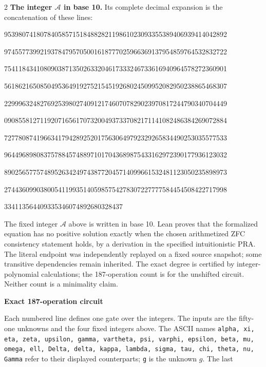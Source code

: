 \documentclass[10pt]{article}
\begin{document}
\begin{multicols}{2}
\textbf{The integer $\mathcal A$ in base 10.}
Its complete decimal expansion is the concatenation of these lines:\par
\begingroup\fontsize{7.7}{8.2}\selectfont{}\par
95398074180784058571518488282119861023093355389406939414042892\par
97455773992193784795705001618777025966369137954859764532832722\par
75411843410809038713502633204617333246733616940964578272360901\par
56186216508504953649192752154519268024509952082950238865468307\par
22999632482769253980274091217460707829023970817244790340704449\par
09085581271192071656170732004937337082171141082486384269072884\par
72778087419663417942892520175630649792329265834490253035577533\par
96449689808375788457488971017043689875433162972390177936123032\par
89025657757489526342497438772045714099661532481123050235898973\par
27443609903800541199351405985754278307227777584454508422717998\par
334113564409335346074892680328437\par
\endgroup
\normalfont\fontsize{7.7}{8.2}\selectfont
The fixed integer $\mathcal A$ above is written in base 10. Lean proves that the formalized equation has no positive solution exactly
when the chosen arithmetized ZFC consistency statement holds, by a derivation
in the specified intuitionistic PRA. The literal endpoint was independently
replayed on a fixed source snapshot; some transitive dependencies remain
inherited. The exact degree is certified by integer-polynomial calculations;
the 187-operation count is for the unshifted circuit. Neither count is a
minimality claim.
\end{multicols}
\clearpage
\begin{center}{\large\bfseries Exact 187-operation circuit}\end{center}
Each numbered line defines one gate over the integers. The inputs are the
fifty-one unknowns and the four fixed integers above. The ASCII names
\texttt{alpha, xi, eta, zeta, upsilon, gamma, vartheta, psi, varphi, epsilon, beta, mu, omega, ell, Delta, delta, kappa, lambda, sigma, tau, chi, theta, nu, Gamma}
refer to their displayed counterparts; \texttt{g} is the unknown $g$. The last
\end{document}

